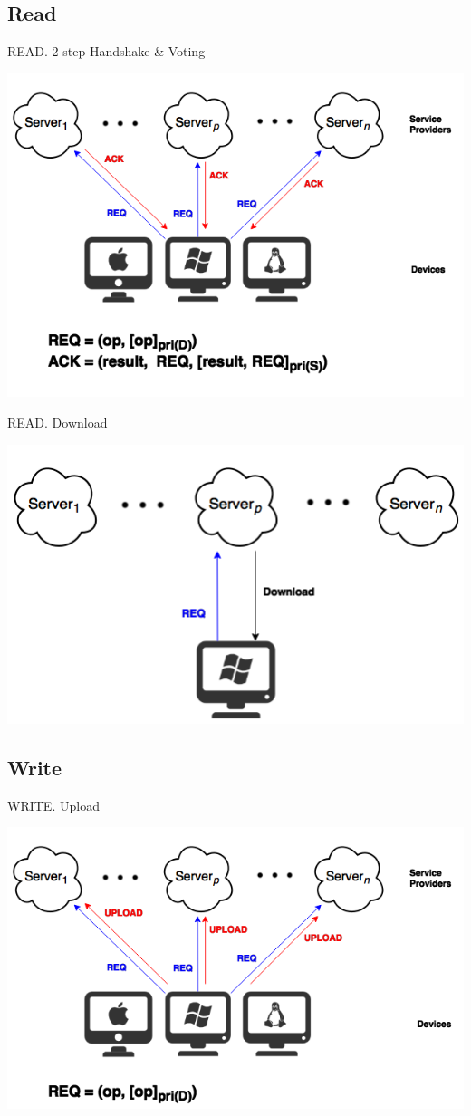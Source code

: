 \documentclass{beamer}
\newcommand{\RNum}[1]{\uppercase\expandafter{\romannumeral #1\relax}}
\begin{document}
\begin{CJK}{UTF8}{bkai}
\subsection{Read}
\begin{frame}{READ}{\RNum{1}. 2-step Handshake \& Voting}
	\begin{center}
	\includegraphics[width=.8\textwidth]{Read1.png}
	\end{center}
\end{frame}

\begin{frame}{READ}{\RNum{2}. Download}
	\begin{center}
	\includegraphics[width=.65\textwidth]{Read2.png}
	\end{center}
\end{frame}

\subsection{Write}
\begin{frame}{WRITE}{\RNum{1}. Upload}
	\begin{center}
	\includegraphics[width=.8\textwidth]{Write1.png}
	\end{center}
\end{frame}


\end{CJK}
\end{document}
